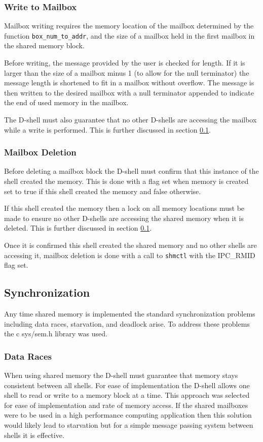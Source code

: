 \documentclass[11pt]{article}
\begin{document}
\begin{multicols}{2}
\subsubsection{Write to Mailbox}
Mailbox writing requires the memory location of the mailbox determined by the function \texttt{box\_num\_to\_addr}, and the size of a mailbox held in the first mailbox in the shared memory block.  

Before writing, the message provided by the user is checked for length. If it is larger than the size of a mailbox minus 1 (to allow for the null terminator) the message length is shortened to fit in a mailbox without overflow. The message is then written to the desired mailbox with a null terminator appended to indicate the end of used memory in the mailbox.

The D-shell must also guarantee that no other D-shells are accessing the mailbox while a write is performed. This is further discussed in section \ref{synchronization}.

\subsubsection{Mailbox Deletion}
Before deleting a mailbox block the D-shell must confirm that this instance of the shell created the memory. This is done with a flag set when memory is created set to true if this shell created the memory and false otherwise. 

If this shell created the memory then a lock on all memory locations must be made to ensure no other D-shells are accessing the shared memory when it is deleted. This is further discussed in section \ref{synchronization}.

Once it is confirmed this shell created the shared memory and no other shells are accessing it, mailbox deletion is done with a call to \texttt{shmctl} with the IPC\_RMID flag set. 

\subsection{Synchronization}\label{synchronization}
Any time shared memory is implemented the standard synchronization problems including data races, starvation, and deadlock arise. To address these problems the c sys/sem.h library was used.

\subsubsection{Data Races}\label{dataraces}
When using shared memory the D-shell must guarantee that memory stays consistent between all shells. For ease of implementation the D-shell allows one shell to read or write to a memory block at a time. This approach was selected for ease of implementation and rate of memory access. If the shared mailboxes were to be used in a high performance computing application then this solution would likely lead to starvation but for a simple message passing system between shells it is effective.


\end{multicols}
\end{document}
